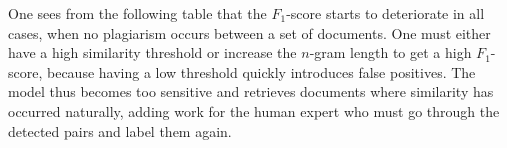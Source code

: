 One sees from the following table that the $F_1$-score starts to deteriorate in all cases, when no plagiarism occurs between a set of documents. One must either have a high similarity threshold or increase the $n$-gram length to get a high $F_1$-score, because having a low threshold quickly introduces false positives. The model thus becomes too sensitive and retrieves documents where similarity has occurred naturally, adding work for the human expert who must go through the detected pairs and label them again. 


\begin{table}[ht]
\centering
\caption{$F_1$-score for SOCO-C1, which contains no cases of plagiarism. False-positives are  introduced as the threshold gets lower.}
\label{tbl-sd-sococ1-fone}
\end{table}


